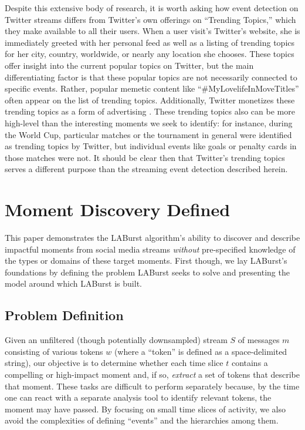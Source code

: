 \documentclass[letterpaper]{article}
\begin{document}
Despite this extensive body of research, it is worth asking how event detection on Twitter streams differs from Twitter's own offerings on ``Trending Topics,'' which they make available to all their users.
When a user visit's Twitter's website, she is immediately greeted with her personal feed as well as a listing of trending topics for her city, country, worldwide, or nearly any location she chooses.
These topics offer insight into the current popular topics on Twitter, but the main differentiating factor is that these popular topics are not necessarily connected to specific events.
Rather, popular memetic content like ``\#MyLovelifeInMoveTitles'' often appear on the list of trending topics.
Additionally, Twitter monetizes these trending topics as a form of advertising \cite{Sydell2011}.  
These trending topics also can be more high-level than the interesting moments we seek to identify: for instance, during the World Cup, particular matches or the tournament in general were identified as trending topics by Twitter, but individual events like goals or penalty cards in those matches were not.
It should be clear then that Twitter's trending topics serves a different purpose than the streaming event detection described herein.

\section{Moment Discovery Defined}
\label{sect:model}

This paper demonstrates the LABurst algorithm's ability to discover and describe impactful moments from social media streams \emph{without} pre-specified knowledge of the types or domains of these target moments.
First though, we lay LABurst's foundations by defining the problem LABurst seeks to solve and presenting the model around which LABurst is built.

\subsection{Problem Definition}

Given an unfiltered (though potentially downsampled) stream $S$ of messages $m$ consisting of various tokens $w$ (where a ``token'' is defined as a space-delimited string), our objective is to determine whether each time slice $t$ contains a compelling or high-impact moment and, if so, \emph{extract} a set of tokens that describe that moment.
These tasks are difficult to perform separately because, by the time one can react with a separate analysis tool to identify relevant tokens, the moment may have passed.
By focusing on small time slices of activity, we also avoid the complexities of defining ``events'' and the hierarchies among them.
\end{document}
